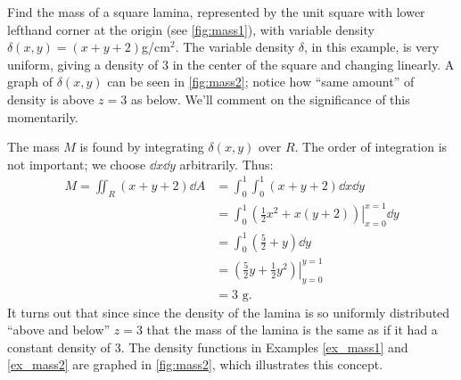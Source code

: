 \begin{example}\label{ex_mass2}%
Find the mass of a square lamina, represented by the unit square with lower lefthand corner at the origin (see \autoref{fig:mass1}), with variable density $\delta(x,y) = (x+y+2)$g/cm$^2$.
\solution
The variable density $\delta$, in this example, is very uniform, giving a density of 3 in the center of the square and changing linearly. A graph of $\delta(x,y)$ can be seen in \autoref{fig:mass2}; notice how ``same amount'' of density is above $z=3$ as below. We'll comment on the significance of this momentarily.

The mass $M$ is found by integrating $\delta(x,y)$ over $R$. The order of integration is not important; we choose $\dd x\dd y$ arbitrarily. Thus:
\begin{align*}
M = \iint_R(x+y+2)\dd A &= \int_0^1\int_0^1 (x+y+2)\dd x\dd y\\
		&= \int_0^1\left.\left(\frac 12x^2+x(y+2)\right)\right|_{x=0}^{x=1}\dd y\\
		&= \int_0^1 \left(\frac52+y\right)\dd y\\
		&= \left.\left(\frac52y+\frac12y^2\right)\right|_{y=0}^{y=1}\\
		&= 3\text{ g}.
\end{align*}
It turns out that since since the density of the lamina is so uniformly distributed ``above and below'' $z=3$ that the mass of the lamina is the same as if it had a constant density of 3. The density functions in Examples \ref{ex_mass1} and \ref{ex_mass2} are graphed in \autoref{fig:mass2}, which illustrates this concept.
\end{example}

